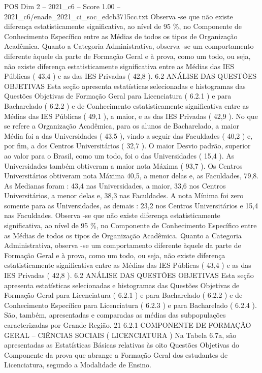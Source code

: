 \begin{textsample}{POS Dim 2 – 2021\_c6 – Score 1.00 – 2021\_c6/enade\_2021\_ci\_soc\_edcb3715cc.txt}
Observa -se que não existe diferença estatisticamente significativa, ao nível de 95 \%, no Componente de Conhecimento Específico entre as Médias de todos os tipos de Organização Acadêmica.
Quanto a Categoria Administrativa, observa -se um comportamento diferente àquele da parte de Formação Geral e à prova, como um todo, ou seja, não existe diferença estatisticamente significativa entre as Médias das IES Públicas ( 43,4 ) e as das IES Privadas ( 42,8 ). 6.2 ANÁLISE DAS QUESTÕES OBJETIVAS Esta seção apresenta estatísticas selecionadas e histogramas das Questões Objetivas de Formação Geral para Licenciatura ( 6.2.1 ) e para Bacharelado ( 6.2.2 ) e de Conhecimento estatisticamente significativa entre as Médias das IES Públicas ( 49,1 ), a maior, e as das IES Privadas ( 42,9 ).
No que se refere a Organização Acadêmica, para os alunos de Bacharelado, a maior Média foi a das Universidades ( 43,5 ), vindo a seguir das Faculdades ( 40,2 ) e, por fim, a dos Centros Universitários ( 32,7 ).
O maior Desvio padrão, superior ao valor para o Brasil, como um todo, foi o das Universidades ( 15,4 ).
As Universidades também obtiveram a maior nota Máxima ( 93,7 ).
Os Centros Universitários obtiveram nota Máxima 40,5, a menor delas e, as Faculdades, 79,8.
As Medianas foram : 43,4 nas Universidades, a maior, 33,6 nos Centros Universitários, a menor delas e, 38,3 nas Faculdades.
A nota Mínima foi zero somente para as Universidades, as demais : 23,2 nos Centros Universitários e 15,4 nas Faculdades.
Observa -se que não existe diferença estatisticamente significativa, ao nível de 95 \%, no Componente de Conhecimento Específico entre as Médias de todos os tipos de Organização Acadêmica.
Quanto a Categoria Administrativa, observa -se um comportamento diferente àquele da parte de Formação Geral e à prova, como um todo, ou seja, não existe diferença estatisticamente significativa entre as Médias das IES Públicas ( 43,4 ) e as das IES Privadas ( 42,8 ). 6.2 ANÁLISE DAS QUESTÕES OBJETIVAS Esta seção apresenta estatísticas selecionadas e histogramas das Questões Objetivas de Formação Geral para Licenciatura ( 6.2.1 ) e para Bacharelado ( 6.2.2 ) e de Conhecimento Específico para Licenciatura ( 6.2.3 ) e para Bacharelado ( 6.2.4 ).
São, também, apresentadas e comparadas as médias das subpopulações caracterizadas por Grande Região. 21 6.2.1 COMPONENTE DE FORMAÇÃO GERAL – CIÊNCIAS SOCIAIS ( LICENCIATURA ) Na Tabela 6.7a, são apresentadas as Estatísticas Básicas relativas às oito Questões Objetivas do Componente da prova que abrange a Formação Geral dos estudantes de Licenciatura, segundo a Modalidade de Ensino.

\end{textsample}
